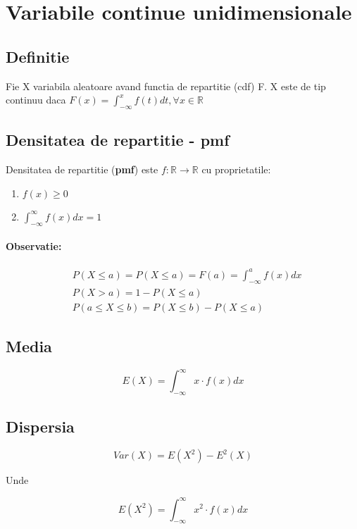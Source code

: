 \documentclass[oneside]{memoir}
\begin{document}
\section[Variabile continue unidimensionale]{Variabile continue unidimensionale}
\subsection*{Definitie}
Fie X variabila aleatoare avand functia de repartitie (cdf) F. X este de tip continuu daca $F(x) = \int_{-\infty}^{x}f(t) dt, \forall x \in \mathbb{R}$

\subsection*{Densitatea de repartitie - pmf} Densitatea de repartitie (\textbf{pmf}) este $f:\mathbb{R}\rightarrow \mathbb{R}$ cu proprietatile:
\begin{enumerate}
    \item $f(x) \geq 0$
    \item $\int_{-\infty}^{\infty}f(x)dx = 1$
\end{enumerate}

\paragraph*{Observatie:} 
\begin{center}
    \begin{equation*}
        \begin{split}
&P(X\le a) = P(X\leq a) = F(a) = \int_{-\infty}^{a}f(x)dx\\
&P(X > a) = 1 - P(X \leq a)\\
&P(a \leq X \leq b) = P(X \leq b) - P(X \leq a)
        \end{split}
    \end{equation*}
\end{center}

\subsection*{Media}
\begin{center}
    \begin{equation*}
E(X) = \int_{-\infty}^{\infty}x\cdot f(x) dx
    \end{equation*}
\end{center}

\subsection*{Dispersia}
\begin{center}
    \begin{equation*}
Var(X) = E(X^2) - E^2(X)
    \end{equation*}
\end{center}
Unde
\begin{center}
    \begin{equation*}
E(X^2) = \int_{-\infty}^{\infty}x^2\cdot f(x) dx
    \end{equation*}
\end{center}
\end{document}
